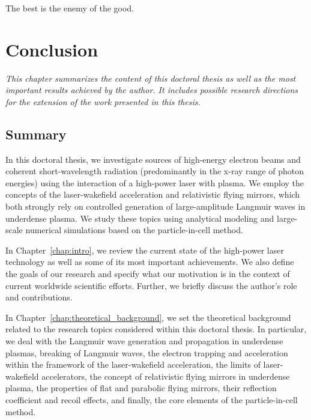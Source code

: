 \documentclass[10pt, a4paper, twoside, openright]{report}
\begin{document}

\begin{savequote}[0.405\linewidth]
	\begin{fquote}
		[-- Voltaire (1694 -- 1778)] The best is the enemy of the good. 
	\end{fquote}
\end{savequote}

\chapter{Conclusion\label{chap:conclusion}}
%

\noindent \textsl{This chapter summarizes the content of this doctoral thesis as well as the most important results achieved by the author. It includes possible research directions for the extension of the work presented in this thesis.}

\section{Summary}

In this doctoral thesis, we investigate sources of high-energy electron beams and coherent short-wavelength radiation (predominantly in the x-ray range of photon energies) using the interaction of a high-power laser with plasma. We employ the concepts of the laser-wakefield acceleration and relativistic flying mirrors, which both strongly rely on controlled generation of large-amplitude Langmuir waves in underdense plasma. We study these topics using analytical modeling and large-scale numerical simulations based on the particle-in-cell method.

In Chapter~\ref{chap:intro}, we review the current state of the high-power laser technology as well as some of its most important achievements. We also define the goals of our research and specify what our motivation is in the context of current worldwide scientific efforts. Further, we briefly discuss the author's role and contributions. 

In Chapter~\ref{chap:theoretical_background}, we set the theoretical background related to the research topics considered within this doctoral thesis. In particular, we deal with the Langmuir wave generation and propagation in underdense plasmas, breaking of Langmuir waves, the electron trapping and acceleration within the framework of the laser-wakefield acceleration, the limits of laser-wakefield accelerators, the concept of relativistic flying mirrors in underdense plasma, the properties of flat and parabolic flying mirrors, their reflection coefficient and recoil effects, and finally, the core elements of the particle-in-cell method.
\end{document}

